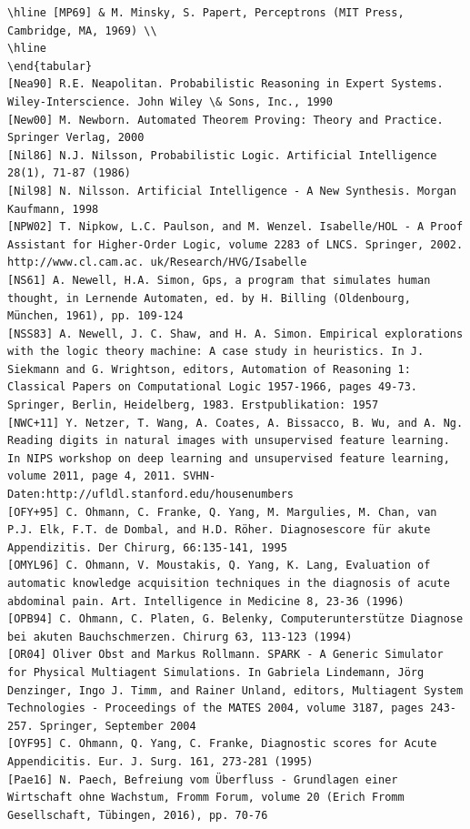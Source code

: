 \documentclass[10pt]{article}
\begin{document}
\begin{verbatim}
\hline [MP69] & M. Minsky, S. Papert, Perceptrons (MIT Press, Cambridge, MA, 1969) \\
\hline
\end{tabular}
[Nea90] R.E. Neapolitan. Probabilistic Reasoning in Expert Systems. Wiley-Interscience. John Wiley \& Sons, Inc., 1990
[New00] M. Newborn. Automated Theorem Proving: Theory and Practice. Springer Verlag, 2000
[Nil86] N.J. Nilsson, Probabilistic Logic. Artificial Intelligence 28(1), 71-87 (1986)
[Nil98] N. Nilsson. Artificial Intelligence - A New Synthesis. Morgan Kaufmann, 1998
[NPW02] T. Nipkow, L.C. Paulson, and M. Wenzel. Isabelle/HOL - A Proof Assistant for Higher-Order Logic, volume 2283 of LNCS. Springer, 2002. http://www.cl.cam.ac. uk/Research/HVG/Isabelle
[NS61] A. Newell, H.A. Simon, Gps, a program that simulates human thought, in Lernende Automaten, ed. by H. Billing (Oldenbourg, München, 1961), pp. 109-124
[NSS83] A. Newell, J. C. Shaw, and H. A. Simon. Empirical explorations with the logic theory machine: A case study in heuristics. In J. Siekmann and G. Wrightson, editors, Automation of Reasoning 1: Classical Papers on Computational Logic 1957-1966, pages 49-73. Springer, Berlin, Heidelberg, 1983. Erstpublikation: 1957
[NWC+11] Y. Netzer, T. Wang, A. Coates, A. Bissacco, B. Wu, and A. Ng. Reading digits in natural images with unsupervised feature learning. In NIPS workshop on deep learning and unsupervised feature learning, volume 2011, page 4, 2011. SVHN-Daten:http://ufldl.stanford.edu/housenumbers
[OFY+95] C. Ohmann, C. Franke, Q. Yang, M. Margulies, M. Chan, van P.J. Elk, F.T. de Dombal, and H.D. Röher. Diagnosescore für akute Appendizitis. Der Chirurg, 66:135-141, 1995
[OMYL96] C. Ohmann, V. Moustakis, Q. Yang, K. Lang, Evaluation of automatic knowledge acquisition techniques in the diagnosis of acute abdominal pain. Art. Intelligence in Medicine 8, 23-36 (1996)
[OPB94] C. Ohmann, C. Platen, G. Belenky, Computerunterstütze Diagnose bei akuten Bauchschmerzen. Chirurg 63, 113-123 (1994)
[OR04] Oliver Obst and Markus Rollmann. SPARK - A Generic Simulator for Physical Multiagent Simulations. In Gabriela Lindemann, Jörg Denzinger, Ingo J. Timm, and Rainer Unland, editors, Multiagent System Technologies - Proceedings of the MATES 2004, volume 3187, pages 243-257. Springer, September 2004
[OYF95] C. Ohmann, Q. Yang, C. Franke, Diagnostic scores for Acute Appendicitis. Eur. J. Surg. 161, 273-281 (1995)
[Pae16] N. Paech, Befreiung vom Überfluss - Grundlagen einer Wirtschaft ohne Wachstum, Fromm Forum, volume 20 (Erich Fromm Gesellschaft, Tübingen, 2016), pp. 70-76

\end{verbatim}
\end{document}
